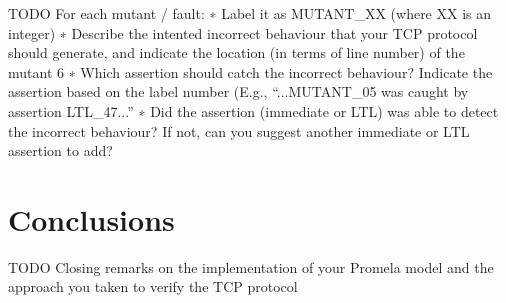 \documentclass{WigReport}
\begin{document}
TODO
For each mutant / fault:
∗ Label it as MUTANT\_XX (where XX is an integer)
∗ Describe the intented incorrect behaviour that your TCP protocol should generate, and indicate the location (in terms of line number) of the mutant 6
∗ Which assertion should catch the incorrect behaviour? Indicate the assertion based on the label number (E.g., “...MUTANT\_05 was caught by assertion LTL\_47...”
∗ Did the assertion (immediate or LTL) was able to detect the incorrect behaviour? If not, can you suggest another immediate or LTL assertion to add?

\section{Conclusions}

TODO Closing remarks on the implementation of your Promela model and the approach you taken to verify the TCP protocol
\end{document}
